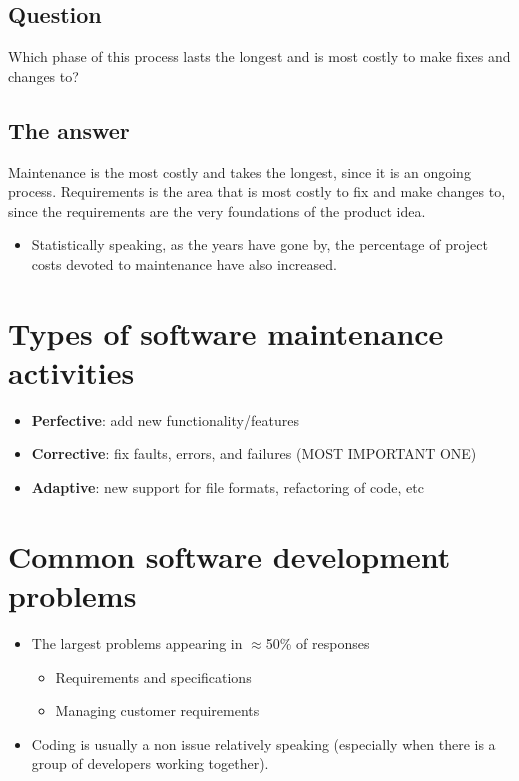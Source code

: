 \documentclass[12pt]{book}
\begin{document}
\subsection*{Question}
Which phase of this process lasts the longest and is most costly to make fixes and changes to?

\subsection*{The answer}
Maintenance is the most costly and takes the longest, since it is an ongoing process. Requirements is the area that is most costly to fix and make changes to, since the requirements are the very foundations of the product idea.

\begin{itemize}
  \item Statistically speaking, as the years have gone by, the percentage of project costs devoted to maintenance have also increased.
\end{itemize}

\newpage
\section*{Types of software maintenance activities}

\begin{itemize}
  \item \textbf{Perfective}: add new functionality/features
  \item \textbf{Corrective}: fix faults, errors, and failures (MOST IMPORTANT ONE)
  \item \textbf{Adaptive}: new support for file formats, refactoring of code, etc
\end{itemize}

\section*{Common software development problems}

\begin{itemize}
  \item The largest problems appearing in $\approx$50\% of responses
  \begin{itemize}
    \item Requirements and specifications
    \item Managing customer requirements
  \end{itemize}

  \item Coding is usually a non issue relatively speaking (especially when there is a group of developers working together).
  
\end{itemize}
\end{document}
